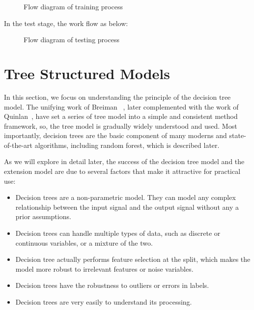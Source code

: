 \documentclass[master]{IPSstyle}
\begin{document}
{\begin{figure}[H]
\caption{Flow diagram of training process}\label{fg:QLSVM_training_flow}
\end{figure}
In the test stage, the work flow as below:
\begin{figure}[H]
\centering
{}
\caption{Flow diagram of testing process}\label{fg:QLSVM_testing_flow}
\end{figure}

\section{Tree Structured Models}
In this section, we focus on understanding the principle of the decision tree model. The unifying work of Breiman ~\cite{breiman:1984}, later complemented with the work of Quinlan~\cite{quinlan:1993}, have set a series of tree model into a simple and consistent method framework, so, the tree model is gradually widely understood and used. Most importantly, decision trees are the basic component of many moderns and state-of-the-art algorithms, including random forest, which is described later. 

As we will explore in detail later, the success of the decision tree model and the extension model are due to several factors that make it attractive for practical use:
\begin{itemize}
\item Decision trees are a non-parametric model. They can model any complex relationship between the input signal and the output signal without any a prior assumptions.
\item Decision trees can handle multiple types of data, such as discrete or continuous variables, or a mixture of the two.
\item Decision tree actually performs feature selection at the split, which makes the model more robust to irrelevant features or noise variables.
\item Decision trees have the robustness to outliers or errors in labels.
\item Decision trees are very easily to understand its processing.
\end{itemize}

}
\end{document}
